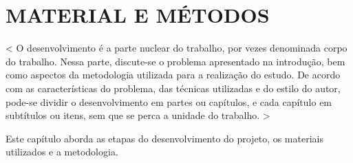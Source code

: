 \chapter{MATERIAL E MÉTODOS}\label{cap3MatMet}

< O desenvolvimento é a parte nuclear do trabalho, por vezes denominada
corpo do trabalho. Nessa parte, discute-se o problema apresentado na introdução, bem
como aspectos da metodologia utilizada para a realização do estudo. De acordo com
as características do problema, das técnicas utilizadas e do estilo do autor, pode-se
dividir o desenvolvimento em partes ou capítulos, e cada capítulo em subtítulos ou
itens, sem que se perca a unidade do trabalho. >

Este capítulo aborda as etapas do desenvolvimento do projeto, os materiais
utilizados e a metodologia.
